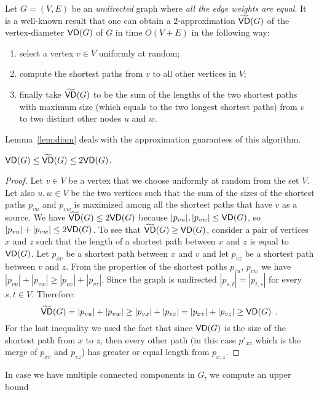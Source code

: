 Let $G=(V,E)$ be an \emph{undirected} graph where \emph{all the edge weights are
equal}.
It is a well-known result that one can obtain a $2$-approximation
$\widetilde{\mathsf{VD}}(G)$ of the vertex-diameter $\mathsf{VD}(G)$ of $G$ in time $O(V+E)$ in
the following way: 
\begin{enumerate}
	\item select a vertex $v\in V$ uniformly at random;
	\item compute the shortest paths from $v$ to all other vertices in $V$;
	\item finally take $\widetilde{\mathsf{VD}}(G)$ to be the sum of the lengths of the
		two shortest paths with maximum size (which equals to the two longest
		shortest paths) from $v$ to two distinct other nodes $u$ and $w$. 
\end{enumerate}
\ifproof
Lemma~\ref{lem:diam} deals with the approximation guarantees of this algorithm.
\begin{lemma}\label{lem:diam}
  $\mathsf{VD}(G)\le\widetilde{\mathsf{VD}}(G)\le 2\mathsf{VD}(G)$.
\end{lemma}
\begin{proof}
  Let $v\in V$ be a vertex that we choose uniformly at random from the set $V$.
  Let also $u,w\in V$ be the two vertices such that the sum of the sizes of the
  shortest paths $p_{vu}$ and $p_{vw}$ is maximized among all the shortest paths
  that have $v$ as a source.  We have $\widetilde{\mathsf{VD}}(G)\le 2\mathsf{VD}(G)$ because
  $|p_{vu}|,|p_{vw}|\le\mathsf{VD}(G)$, so $|p_{vu}|+|p_{vw}|\le 2\mathsf{VD}(G)$. To see
  that $\widetilde{\mathsf{VD}}(G)\ge\mathsf{VD}(G)$, consider a pair of vertices $x$ and $z$ such
  that the length of a shortest path between $x$ and $z$ is equal to $\mathsf{VD}(G)$.
  Let $p_{xv}$ be a shortest path between $x$ and $v$ and let $p_{vz}$ be a
  shortest path between $v$ and $z$. 
  From the properties of the shortest paths $p_{vu}$, $p_{vw}$ we have
  $|p_{vu}|+|p_{vw}|\geq |p_{vx}|+|p_{vz}|$. Since the graph is undirected
  $|p_{s,t}|=|p_{t,s}|$ for every $s,t\in V$.
  Therefore:
  \[
    \widetilde{\mathsf{VD}}(G) = |p_{vu}|+|p_{vw}|\geq |p_{vx}|+|p_{vz}| =
    |p_{xv}|+|p_{vz}|\ge\mathsf{VD}(G)\enspace. 
  \]
  For the last inequality we used the fact that since $\mathsf{VD}(G)$ is the size of
  the shortest path from $x$ to $z$, then every other path (in this case
  $p'_{xz}$ which is the merge of $p_{xv}$ and $p_{vz}$) has greater or equal
  length from $p_{x,z}$.
\end{proof}
In case we have multiple connected components in $G$, we compute an upper bound
